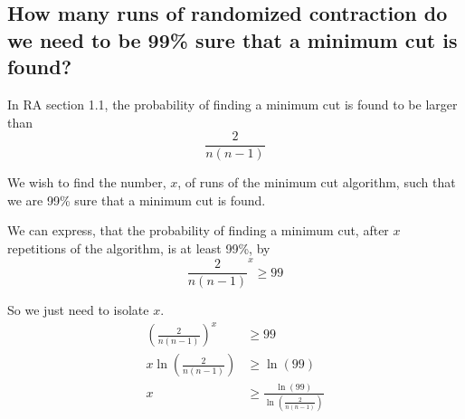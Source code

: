 \subsection*{How many runs of randomized contraction do we need to be 99\% sure that a minimum cut is found?}

In RA section 1.1, the probability of finding a minimum cut is found to be larger than
$$
\frac{2}{n(n-1)}
$$

We wish to find the number, $x$, of runs of the minimum cut algorithm, such that we are 99\% sure that a minimum cut is found.

We can express, that the probability of finding a minimum cut, after $x$ repetitions of the algorithm, is at least 99\%, by
$$
\frac{2}{n(n-1)}^x \geq 99
$$

So we just need to isolate $x$.
$$
\begin{aligned}
\left(\frac{2}{n(n-1)}\right)^x & \geq 99
\\
x\ln\left(\frac{2}{n(n-1)}\right) & \geq \ln(99)
\\
x & \geq \frac{\ln(99)}{\ln\left(\frac{2}{n(n-1)}\right)}
\end{aligned}
$$